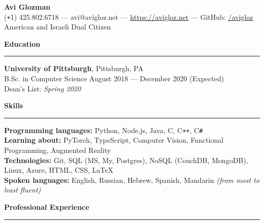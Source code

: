 \documentclass[11pt]{article}
\begin{document}
	\pagestyle{empty}
	\begin{center}
		{\LARGE \textbf{Avi Glozman}}\\
		\vspace{1.25mm}
		{\large {\normalsize(}\texttt{+}1{\normalsize)} 425.802.6718 --- avi@avigloz.net --- \href{https://avigloz.net}{https://avigloz.net} --- GitHub: \href{https://github.com/avigloz}{/avigloz}}\\
		\vspace{1mm}
		American and Israeli Dual Citizen
	\end{center}
	
	\begin{flushleft}
		
		\vspace{-1.65mm}
		{\large \raggedright \textbf{Education}}
		\vspace{1.25mm}
	
		\hrule
		
		\vspace{2.25mm}
		\textbf{University of Pittsburgh}, Pittsburgh, PA\\
		{\small B.Sc. in Computer Science \hfill August 2018 --- December 2020 (Expected)}\\
		{\small Dean's List: \textit{Spring 2020}}
	
		\vspace{1.5mm}
		{\large \raggedright \textbf{Skills}}
		\vspace{1.25mm}
	
		\hrule
	
		\vspace{2.25mm}
		\textbf{Programming languages:} Python, Node.js, Java, C, C\texttt{++}, C\verb!#!\\
		\textbf{Learning about:} PyTorch, TypeScript, Computer Vision, Functional Programming, Augmented Reality\\
		\textbf{Technologies:} Git, SQL (MS, My, Postgres), NoSQL (CouchDB, MongoDB), Linux, Azure, HTML, CSS, \LaTeX\\
		\textbf{Spoken languages:} English, Russian, Hebrew, Spanish, Mandarin \textit{(from most to least fluent)}

		\vspace{1.5mm}
		{\large \raggedright \textbf{Professional Experience}}
		\vspace{1.25mm}
	
		\hrule


\end{flushleft}
\end{document}
